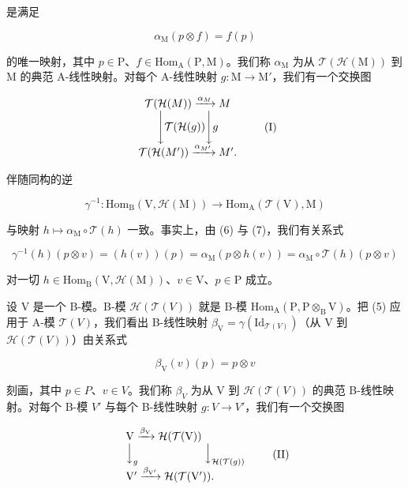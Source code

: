 是满足

\[
\alpha_ {\mathrm{M}} (p \otimes f) = f (p)\tag{7}
\]

的唯一映射，其中 \(p \in \mathrm{P}\)、\(f \in \mathrm{Hom}_{\mathrm{A}}(\mathrm{P}, \mathrm{M})\)。我们称 \(\alpha_{\mathrm{M}}\) 为从 \(\mathcal{T}(\mathcal{H}(\mathrm{M}))\) 到 M 的典范 A-线性映射。对每个 A-线性映射 \(g: \mathrm{M} \to \mathrm{M}'\)，我们有一个交换图

\[
\begin{array}{c} \mathcal {T} (\mathcal {H} (M)) \xrightarrow {\alpha_ {M}} M \\ \Biggl \downarrow \mathcal {T} (\mathcal {H} (g)) \Biggl \downarrow g \\ \mathcal {T} (\mathcal {H} (M ^ {\prime})) \xrightarrow {\alpha_ {M ^ {\prime}}} M ^ {\prime}. \end{array}\tag{I}
\]

伴随同构的逆

\[
\gamma^ {- 1}: \mathrm{Hom} _ {\mathrm{B}} (\mathrm{V}, \mathcal {H} (\mathrm{M})) \longrightarrow \mathrm{Hom} _ {\mathrm{A}} (\mathcal {T} (\mathrm{V}), \mathrm{M})
\]

与映射 \(h \mapsto \alpha_{\mathrm{M}} \circ \mathcal{T}(h)\) 一致。事实上，由 (6) 与 (7)，我们有关系式

\[
\gamma^ {- 1} (h) (p \otimes v) = (h (v)) (p) = \alpha_ {\mathrm{M}} (p \otimes h (v)) = \alpha_ {\mathrm{M}} \circ \mathcal {T} (h) (p \otimes v)
\]

对一切 \(h\in \mathrm{Hom}_{\mathrm{B}}(\mathrm{V},\mathcal{H}(\mathrm{M}))\)、\(v\in \mathrm{V}\)、\(p\in \mathrm{P}\) 成立。

设 V 是一个 B-模。B-模 \(\mathcal{H}(\mathcal{T}(V))\) 就是 B-模 \(\mathrm{Hom}_{\mathrm{A}}(\mathrm{P},\mathrm{P}\otimes_{\mathrm{B}}\mathrm{V})\)。把 (5) 应用于 A-模 \(\mathcal{T}(V)\)，我们看出 B-线性映射 \(\beta_{\mathrm{V}}=\gamma(\mathrm{Id}_{\mathcal{T}(V)})\)（从 V 到 \(\mathcal{H}(\mathcal{T}(V))\)）由关系式

\[
\beta_ {\mathrm{V}} (v) (p) = p \otimes v\tag{8}
\]

刻画，其中 \(p \in P\)、\(v \in V\)。我们称 \(\beta_{V}\) 为从 V 到 \(\mathcal{H}(\mathcal{T}(V))\) 的典范 B-线性映射。对每个 B-模 \(V'\) 与每个 B-线性映射 \(g : V \to V'\)，我们有一个交换图

\[
\begin{array}{l} \mathrm{V} \xrightarrow {\beta_ {\mathrm{V}}} \mathcal {H} (\mathcal {T} (\mathrm{V})) \\ \Big \downarrow_ {g} \qquad \qquad \qquad \Big \downarrow_ {\mathcal {H} (\mathcal {T} (g))} \\ \mathrm{V} ^ {\prime} \xrightarrow {\beta_ {\mathrm{V} ^ {\prime}}} \mathcal {H} (\mathcal {T} (\mathrm{V} ^ {\prime})). \end{array}\tag{II}
\]

